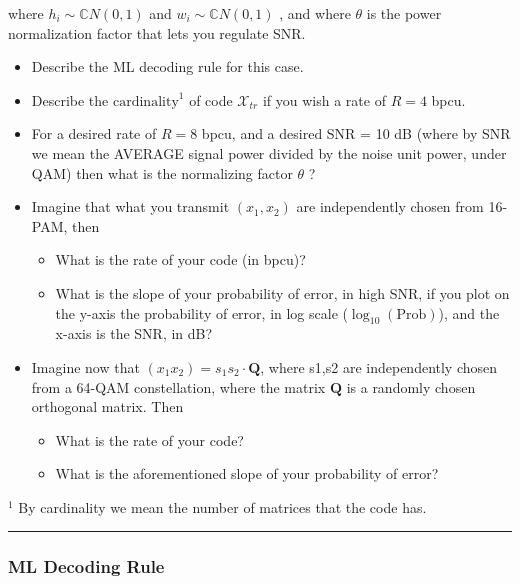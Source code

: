 \documentclass[11pt]{article}
\providecommand{\tightlist}{%
      \setlength{\itemsep}{0pt}\setlength{\parskip}{0pt}}
\begin{document}
where \(h_i \sim \mathbb{C}N(0,1)\) and \(w_i \sim \mathbb{C}N(0,1)\) ,
and where \(\theta\) is the power normalization factor that lets you
regulate SNR.

\begin{itemize}
\tightlist
\item
  Describe the ML decoding rule for this case.
\item
  Describe the \(\text{cardinality}^1\) of code \(\mathcal{X}_{tr}\) if
  you wish a rate of \(R = 4\) bpcu.
\item
  For a desired rate of \(R = 8\) bpcu, and a desired SNR = 10 dB (where
  by SNR we mean the AVERAGE signal power divided by the noise unit
  power, under QAM) then what is the normalizing factor \(\theta\) ?
\item
  Imagine that what you transmit \((x_1,x_2)\) are independently chosen
  from 16-PAM, then

  \begin{itemize}
  \tightlist
  \item
    What is the rate of your code (in bpcu)?
  \item
    What is the slope of your probability of error, in high SNR, if you
    plot on the y-axis the probability of error, in log scale
    (\(\log_{10}(\text{Prob})\)), and the x-axis is the SNR, in dB?
  \end{itemize}
\item
  Imagine now that \(( x_1 x_2 ) = s_1 s_2 \cdot \mathbf{Q}\), where
  s1,s2 are independently chosen from a 64-QAM constellation, where the
  matrix \(\mathbf{Q}\) is a randomly chosen orthogonal matrix. Then

  \begin{itemize}
  \tightlist
  \item
    What is the rate of your code?\\
  \item
    What is the aforementioned slope of your probability of error?
  \end{itemize}
\end{itemize}

\(^1\) By cardinality we mean the number of matrices that the code has.

    \begin{center}\rule{0.5\linewidth}{0.5pt}\end{center}

\subsubsection{ML Decoding Rule}\label{ml-decoding-rule}
\end{document}
